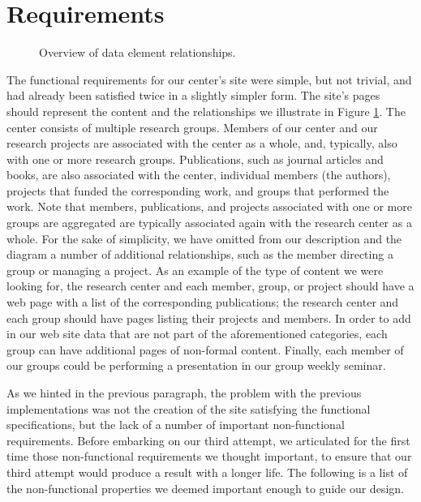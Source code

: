 \documentclass[10pt]{article}
\begin{document}
\section{Requirements}
\label{sec:req}

\begin{figure}
\begin{center}
\leavevmode
{}
\end{center}
\caption{
\label{fig:diag}
Overview of data element relationships.}
\end{figure}

The functional requirements for our center's site were
simple, but not trivial, and had already been satisfied
twice in a slightly simpler form.
The site's pages should represent the content and the relationships
we illustrate in Figure \ref{fig:diag}.
The center consists of multiple research groups.
Members of our center and our research projects are
associated with the center as a whole, and, typically, also
with one or more research groups.
Publications, such as journal articles and books,
are also associated with the center, individual members (the authors),
projects that funded the corresponding work,
and groups that performed the work.
Note that members, publications, and projects associated
with one or more groups are aggregated are typically associated
again with the research center as a whole.
For the sake of simplicity,
we have omitted from our description and the diagram
a number of additional relationships,
such as the member directing a group or managing a project.
As an example of the type of content we were looking for,
the research center and
each member, group, or project should have a web page with a list
of the corresponding publications;
the research center and each group should have pages listing
their projects and members. 
In order to add in our web site data that are not part of the aforementioned categories,
each group can have additional pages of non-formal content.
Finally, each member of our groups could be performing a presentation in our group weekly seminar.

As we hinted in the previous paragraph, the problem with
the previous implementations was not the creation of the site
satisfying the functional specifications,
but the lack of a number of important non-functional requirements.
Before embarking on our third attempt,
we articulated for the first time those non-functional requirements
we thought important, to ensure that our third attempt would produce
a result with a longer life.
The following is a list of the non-functional properties
we deemed important enough to guide our design.
\end{document}
